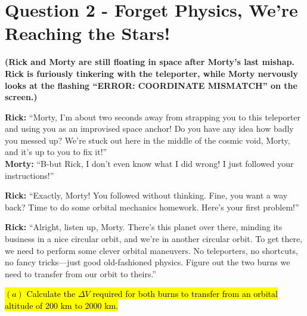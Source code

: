 \documentclass[a4paper, 12pt]{exam}
\begin{document}
	\pagebreak
	
	\section*{Question 2 - Forget Physics, We’re Reaching the Stars!}

\noindent \textbf{(Rick and Morty are still floating in space after Morty’s last mishap. Rick is furiously tinkering with the teleporter, while Morty nervously looks at the flashing “ERROR: COORDINATE MISMATCH” on the screen.)}

\bigskip
\noindent \textbf{Rick:} “Morty, I’m about two seconds away from strapping you to this teleporter and using you as an improvised space anchor! Do you have any idea how badly you messed up? We’re stuck out here in the middle of the cosmic void, Morty, and it’s up to you to fix it!” \\

\noindent \textbf{Morty:} “B-but Rick, I don’t even know what I did wrong! I just followed your instructions!” \bigskip

\noindent \textbf{Rick:} “Exactly, Morty! You followed without thinking. Fine, you want a way back? Time to do some orbital mechanics homework. Here’s your first problem!”

\bigskip

\noindent \textbf{Rick:} “Alright, listen up, Morty. There’s this planet over there, minding its business in a nice circular orbit, and we’re in another circular orbit. To get there, we need to perform some clever orbital maneuvers. No teleporters, no shortcuts, no fancy tricks—just good old-fashioned physics. Figure out the two burns we need to transfer from our orbit to theirs.”

\bigskip

\hl{$(a)$ Calculate the $\Delta V$ required for both burns to transfer from an orbital altitude of 200 km to 2000 km.}
\end{document}
